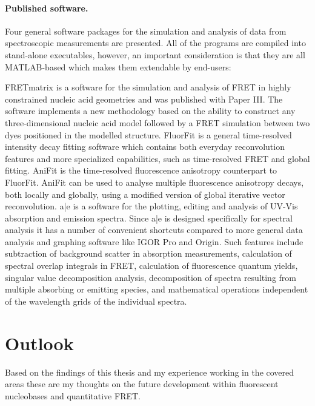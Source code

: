  \paragraph{Published software.} Four general software packages for the simulation and analysis of data from spectroscopic measurements are presented. All of the programs are compiled into stand-alone executables, however, an important consideration is that they are all MATLAB-based which makes them extendable by end-users:

 FRETmatrix is a software for the simulation and analysis of FRET in highly constrained nucleic acid geometries and was published with Paper III. The software implements a new methodology based on the ability to construct any three-dimensional nucleic acid model followed by a FRET simulation between two dyes positioned in the modelled structure. FluorFit is a general time-resolved intensity decay fitting software which contains both everyday reconvolution features and more specialized capabilities, such as time-resolved FRET and global fitting. AniFit is the time-resolved fluorescence anisotropy counterpart to FluorFit. AniFit can be used to analyse multiple fluorescence anisotropy decays, both locally and globally, using a modified version of global iterative vector reconvolution. a|e is a software for the plotting, editing and analysis of UV-Vis absorption and emission spectra. Since a|e is designed specifically for spectral analysis it has a number of convenient shortcuts compared to more general data analysis and graphing software like IGOR Pro and Origin. Such features include subtraction of background scatter in absorption measurements, calculation of spectral overlap integrals in FRET, calculation of fluorescence quantum yields, singular value decomposition analysis, decomposition of spectra resulting from multiple absorbing or emitting species, and mathematical operations independent of the wavelength grids of the individual spectra.

\section{Outlook}
 Based on the findings of this thesis and my experience working in the covered areas these are my thoughts on the future development within fluorescent nucleobases and quantitative FRET.

